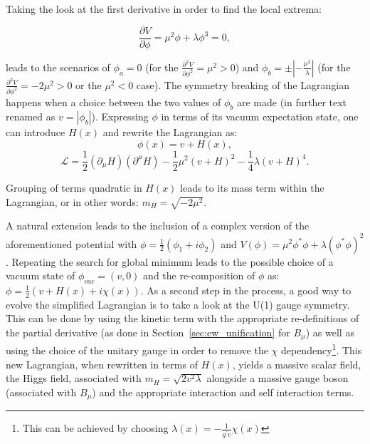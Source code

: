 Taking the look at the first derivative in order to find the local extrema:

\begin{equation}
    \frac{\partial V}{\partial \phi} = \mu^2\phi + \lambda \phi^3 = 0,
\end{equation}

leads to the scenarios of $\phi_a = 0$ (for the $\frac{\partial^2 V}{\partial \phi^2} = \mu^2>0$) and $\phi_b = \pm|-\frac{\mu^2}{\lambda}|$ (for the $\frac{\partial^2 V}{\partial \phi^2} = -2\mu^2>0$ or the $\mu^2<0$ case). The symmetry breaking of the Lagrangian happens when a choice between the two values of $\phi_b$ are made (in further text renamed as $v = |\phi_b|$). Expressing $\phi$ in terms of its vacuum expectation state, one can introduce $H(x)$ and rewrite the Lagrangian as:
\begin{equation}
    \phi(x) = v+H(x),
\end{equation}
\begin{equation}
    \mathcal{L} = \frac{1}{2}(\partial_{\mu}H)(\partial^{\mu}H) - \frac{1}{2}\mu^2(v+H)^2 - \frac{1}{4}\lambda(v+H)^4.
\end{equation}

Grouping of terms quadratic in $H(x)$ leads to its mass term within the Lagrangian, or in other words: $m_{H} = \sqrt{-2\mu^2}$.

\hspace{10pt} A natural extension leads to the inclusion of a complex version of the aforementioned potential with $\phi = \frac{1}{2} (\phi_1+i\phi_2)$ and $V(\phi) = \mu^2\phi^*\phi+\lambda(\phi^*\phi)^2$. Repeating the search for global minimum leads to the possible choice of a vacuum state of $\phi_{vac} = (v, 0)$ and the re-composition of $\phi$ as: $\phi = \frac{1}{2}(v+H(x)+i\chi(x))$. As a second step in the process, a good way to evolve the simplified Lagrangian is to take a look at the U(1) gauge symmetry. This can be done by using the kinetic term with the appropriate re-definitions of the partial derivative (as done in Section~\ref{sec:ew_unification} for $B_{\mu}$) as well as using the choice of the unitary gauge in order to remove the $\chi$ dependency\footnote{This can be achieved by choosing $\lambda(x) = -\frac{1}{g^{'}v}\chi(x)$}. This new Lagrangian, when rewritten in terms of $H(x)$, yields a massive scalar field, the Higgs field, associated with $m_{H} =\sqrt{2v^2\lambda}$ alongside a massive gauge boson (associated with $B_{\mu}$) and the appropriate interaction and self interaction terms.

